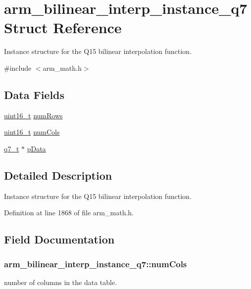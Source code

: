 \hypertarget{structarm__bilinear__interp__instance__q7}{\section{arm\-\_\-bilinear\-\_\-interp\-\_\-instance\-\_\-q7 Struct Reference}
\label{structarm__bilinear__interp__instance__q7}
}


Instance structure for the Q15 bilinear interpolation function.  




{\ttfamily \#include $<$arm\-\_\-math.\-h$>$}

\subsection*{Data Fields}
\begin{DoxyCompactItemize}
\item 
\hyperlink{stdint_8h_a273cf69d639a59973b6019625df33e30}{uint16\-\_\-t} \hyperlink{structarm__bilinear__interp__instance__q7_ad5a8067cab5f9ea4688b11a623e16607}{num\-Rows}
\item 
\hyperlink{stdint_8h_a273cf69d639a59973b6019625df33e30}{uint16\-\_\-t} \hyperlink{structarm__bilinear__interp__instance__q7_a860dd0d24380ea06cfbb348fb3b12c9a}{num\-Cols}
\item 
\hyperlink{arm__math_8h_ae541b6f232c305361e9b416fc9eed263}{q7\-\_\-t} $\ast$ \hyperlink{structarm__bilinear__interp__instance__q7_af05194d691bbefb02c34bafb22ca9ef0}{p\-Data}
\end{DoxyCompactItemize}


\subsection{Detailed Description}
Instance structure for the Q15 bilinear interpolation function. 

Definition at line 1868 of file arm\-\_\-math.\-h.



\subsection{Field Documentation}
\hypertarget{structarm__bilinear__interp__instance__q7_a860dd0d24380ea06cfbb348fb3b12c9a}{
\subsubsection[{num\-Cols}]{ arm\-\_\-bilinear\-\_\-interp\-\_\-instance\-\_\-q7\-::num\-Cols}}\label{structarm__bilinear__interp__instance__q7_a860dd0d24380ea06cfbb348fb3b12c9a}
number of columns in the data table. 

